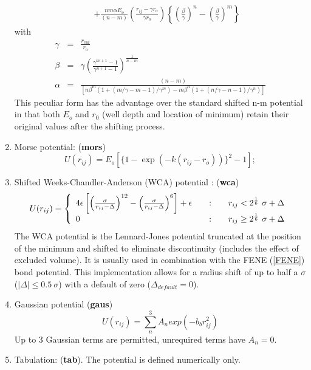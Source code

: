 \begin{enumerate}
\begin{eqnarray}
& & +\frac{nm\alpha E_{o}}{(n-m)} \left ( \frac{r_{ij}-\gamma r_{o}}{\gamma r_{o}}
\right )\left\{\left(\frac{\beta}{\gamma}\right
)^{n}-\left(\frac{\beta}{\gamma}\right )^{m}\right \}
\end{eqnarray}
with
\begin{eqnarray}
\gamma &=&\frac{r_{cut}}{r_{o}} \\
\beta &=& \gamma\left ( \frac{\gamma^{m+1}-1}{\gamma^{n+1}-1} \right )
^{\frac{1}{n-m}} \\
\alpha&=&\frac{(n-m)}{[n\beta^{m}(1+(m/\gamma-m-1)/\gamma^{m})-
m\beta^{n}(1+(n/\gamma-n-1)/\gamma^{n})]}
\end{eqnarray}
This peculiar form has the advantage over the standard shifted n-m
potential in that both $E_{o}$ and $r_{0}$ (well depth and location of
minimum) retain their original values after the shifting process.
\item Morse potential:  ({\bf mors})
\begin{equation}
U(r_{ij})=E_{o}[\{1-\exp(-k(r_{ij}-r_{o}))\}^{2}-1];
\end{equation}
\item Shifted Weeks-Chandler-Anderson (WCA) potential \cite{weeks-71}:  ({\bf wca})
\begin{equation}
U(r_{ij}) = \left\{ \begin{array} {l@{\qquad:\qquad}l}
4\epsilon\left[\left(\frac{\sigma}{r_{ij}-\Delta}\right)^{12}-\left(\frac{\sigma}{r_{ij}-\Delta}\right)^{6}\right]
+\epsilon & r_{ij} < 2^{1 \over 6}~\sigma + \Delta \\
0 & r_{ij} \ge 2^{1 \over 6}~\sigma + \Delta \end{array} \right. \label{wca}
\end{equation}
The WCA potential is the Lennard-Jones potential truncated at the
position of the minimum and shifted to eliminate discontinuity
(includes the effect of excluded volume).  It is usually used in
combination with the FENE (\ref{FENE}) bond potential.  This
implementation allows for a radius shift of up to half a $\sigma$
($|\Delta| \le 0.5~\sigma$) with a default of zero
($\Delta_{default} = 0$).

\item Gaussian potential ({\bf gaus})
\begin{equation}
U(r_{ij}) = \sum_{n}^{3} A_{n}exp(-b_{b}r_{ij}^{2})
\end{equation}
Up to 3 Gaussian terms are permitted, unrequired terms have $A_{n}=0$.

\item Tabulation: ({\bf tab}). The potential is defined numerically only.
\end{enumerate}

